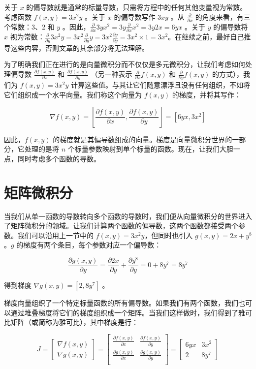 \documentclass[lang=cn,newtx,10pt,scheme=chinese]{elegantbook}
\begin{document}
关于 $x$ 的偏导数就是通常的标量导数，只需将方程中的任何其他变量视为常数。考虑函数 $f(x, y) = 3x^2y$ 。关于 $x$ 的偏导数写作 $3xy$ 。从 $\frac{\partial}{\partial x}$ 的角度来看，有三个常数：$3$、$2$ 和 $y$ 。因此，$\frac{\partial}{\partial x} 3yx^2 = 3y\frac{\partial}{\partial x} x^2 = 3y2x = 6yx$ 。关于 $y$ 的偏导数将 $x$ 视为常数：$\frac{\partial}{\partial y} 3x^2y = 3x^2\frac{\partial}{\partial y} y = 3x^2\frac{\partial y}{\partial y} = 3x^2 \times 1 = 3x^2$。在继续之前，最好自己推导这些内容，否则文章的其余部分将无法理解。

为了明确我们正在进行的是向量微积分而不仅仅是多元微积分，让我们考虑如何处理偏导数 $\frac{\partial f(x,y)}{\partial x}$ 和 $\frac{\partial f(x,y)}{\partial y}$ （另一种表示 $\frac{\partial}{\partial x}f(x,y)$ 和 $\frac{\partial }{\partial y}f(x,y)$ 的方式），我们为 $f(x, y) = 3x^2y$ 计算这些值。与其让它们随意漂浮且没有任何组织，不如将它们组织成一个水平向量。我们称这个向量为 $f(x, y)$ 的梯度，并将其写作：

\[\nabla f(x,y)  = [ \frac{\partial f(x,y)}{\partial x}, \frac{\partial f(x,y)}{\partial y}] = [6yx, 3x^2]\]

因此，$f(x, y)$ 的梯度就是其偏导数组成的向量。梯度是向量微积分世界的一部分，它处理的是将 $n$ 个标量参数映射到单个标量的函数。现在，让我们大胆一点，同时考虑多个函数的导数。

\chapter{矩阵微积分}

当我们从单一函数的导数转向多个函数的导数时，我们便从向量微积分的世界进入了矩阵微积分的领域。让我们计算两个函数的偏导数，这两个函数都接受两个参数。我们可以沿用上一节中的 $f(x, y) = 3x^2y$，但同时也引入 $g(x, y) = 2x + y^8$。$g$ 的梯度有两个条目，每个参数对应一个偏导数：

\[\frac{\partial g(x,y)}{\partial y} = \frac{\partial 2x}{\partial y} + \frac{\partial y^8}{\partial y} = 0 + 8y^7 = 8y^7\]

得到梯度 $\nabla g(x,y) = [2, 8y^7]$ 。

梯度向量组织了一个特定标量函数的所有偏导数。如果我们有两个函数，我们也可以通过堆叠梯度将它们的梯度组织成一个矩阵。当我们这样做时，我们得到了雅可比矩阵（或简称为雅可比），其中梯度是行：

\[J =
\begin{bmatrix}
	\nabla f(x,y)\\
	\nabla g(x,y)
\end{bmatrix} = \begin{bmatrix}
 \frac{\partial f(x,y)}{\partial x} & \frac{\partial f(x,y)}{\partial y}\\
 \frac{\partial g(x,y)}{\partial x} & \frac{\partial g(x,y)}{\partial y}\\
\end{bmatrix} = \begin{bmatrix}
	6yx & 3x^2\\
	2 & 8y^7
\end{bmatrix}\]
\end{document}
